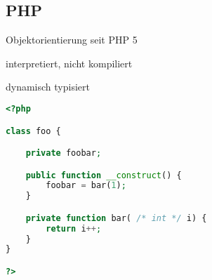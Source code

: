 \subsection{PHP}
\label{sec:php}

Objektorientierung seit PHP 5

\begin{compactitem}
    \item interpretiert, nicht kompiliert
    \item dynamisch typisiert
\end{compactitem}


\begin{lstlisting}[language=php]
<?php

class foo {

    private foobar;

    public function __construct() {
        foobar = bar(1);
    } 

    private function bar( /* int */ i) {
        return i++;
    }
}

?>
\end{lstlisting}



